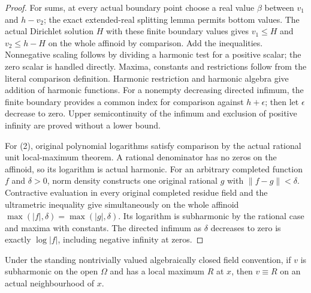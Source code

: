 \begin{proof}
For sums, at every actual boundary point choose a real value $\beta$ between
$v_1$ and $h-v_2$; the exact extended-real splitting lemma permits bottom values.
The actual Dirichlet solution $H$ with these finite boundary values gives
$v_1\le H$ and $v_2\le h-H$ on the whole affinoid by comparison. Add the inequalities.
Nonnegative scaling follows by dividing a harmonic test for a positive scalar;
the zero scalar is handled directly. Maxima, constants and restrictions follow
from the literal comparison definition. Harmonic restriction and harmonic algebra
give addition of harmonic functions. For a nonempty decreasing directed infimum,
the finite boundary provides a common index for comparison against $h+\epsilon$;
then let $\epsilon$ decrease to zero. Upper semicontinuity of the infimum and
exclusion of positive infinity are proved without a lower bound.

For (2), original polynomial logarithms satisfy comparison by the actual rational
unit local-maximum theorem. A rational denominator has no zeros on the affinoid,
so its logarithm is actual harmonic. For an arbitrary completed function $f$ and
$\delta>0$, norm density constructs one original rational $g$ with
$\|f-g\|<\delta$. Contractive evaluation in every original completed residue field
and the ultrametric inequality give simultaneously on the whole affinoid
$\max(|f|,\delta)=\max(|g|,\delta)$. Its logarithm is subharmonic by the rational
case and maxima with constants. The directed infimum as $\delta$ decreases to zero
is exactly $\log|f|$, including negative infinity at zeros.
\end{proof}

\begin{lemma}\label{lem:fc-line-mp}
\leanok
{}
Under the standing nontrivially valued algebraically closed field convention,
if $v$ is subharmonic on the open $\Omega$ and has a local maximum $R$ at $x$,
then $v\equiv R$ on an actual neighbourhood of $x$.
\end{lemma}

